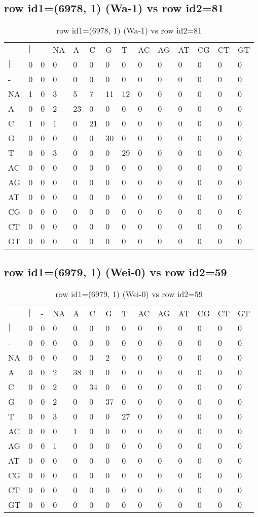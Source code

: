 \subsection{row id1=(6978, 1) (Wa-1) vs row id2=81}
\begin{center}
\begin{longtable}{|l|l|l|l|l|l|l|l|l|l|l|l|l|l|}
\caption{row id1=(6978, 1) (Wa-1) vs row id2=81} \label{table_dm198}\\
\hline
\\
\hline
&$|$&-&NA&A&C&G&T&AC&AG&AT&CG&CT&GT\\
$|$&0&0&0&0&0&0&0&0&0&0&0&0&0\\
-&0&0&0&0&0&0&0&0&0&0&0&0&0\\
NA&1&0&3&5&7&11&12&0&0&0&0&0&0\\
A&0&0&2&23&0&0&0&0&0&0&0&0&0\\
C&1&0&1&0&21&0&0&0&0&0&0&0&0\\
G&0&0&0&0&0&30&0&0&0&0&0&0&0\\
T&0&0&3&0&0&0&29&0&0&0&0&0&0\\
AC&0&0&0&0&0&0&0&0&0&0&0&0&0\\
AG&0&0&0&0&0&0&0&0&0&0&0&0&0\\
AT&0&0&0&0&0&0&0&0&0&0&0&0&0\\
CG&0&0&0&0&0&0&0&0&0&0&0&0&0\\
CT&0&0&0&0&0&0&0&0&0&0&0&0&0\\
GT&0&0&0&0&0&0&0&0&0&0&0&0&0\\
\hline
\end{longtable}
\end{center}

\subsection{row id1=(6979, 1) (Wei-0) vs row id2=59}
\begin{center}
\begin{longtable}{|l|l|l|l|l|l|l|l|l|l|l|l|l|l|}
\caption{row id1=(6979, 1) (Wei-0) vs row id2=59} \label{table_dm200}\\
\hline
\\
\hline
&$|$&-&NA&A&C&G&T&AC&AG&AT&CG&CT&GT\\
$|$&0&0&0&0&0&0&0&0&0&0&0&0&0\\
-&0&0&0&0&0&0&0&0&0&0&0&0&0\\
NA&0&0&0&0&0&2&0&0&0&0&0&0&0\\
A&0&0&2&38&0&0&0&0&0&0&0&0&0\\
C&0&0&2&0&34&0&0&0&0&0&0&0&0\\
G&0&0&2&0&0&37&0&0&0&0&0&0&0\\
T&0&0&3&0&0&0&27&0&0&0&0&0&0\\
AC&0&0&0&1&0&0&0&0&0&0&0&0&0\\
AG&0&0&1&0&0&0&0&0&0&0&0&0&0\\
AT&0&0&0&0&0&0&0&0&0&0&0&0&0\\
CG&0&0&0&0&0&0&0&0&0&0&0&0&0\\
CT&0&0&0&0&0&0&0&0&0&0&0&0&0\\
GT&0&0&0&0&0&0&0&0&0&0&0&0&0\\
\hline
\end{longtable}
\end{center}

